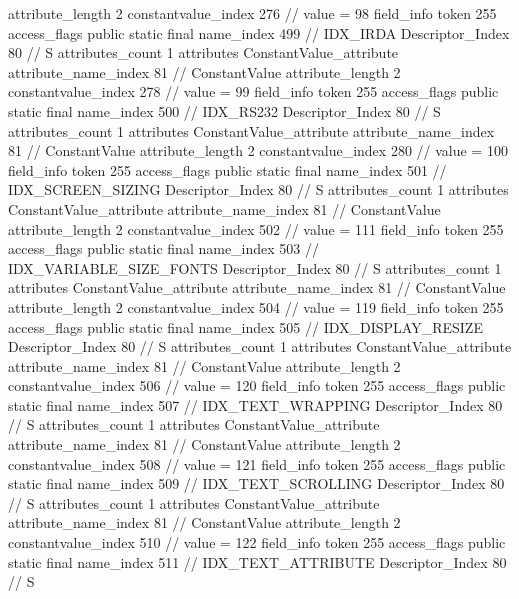 {{{{{{{					attribute_length	2
					constantvalue_index	276		// value = 98
				}
				}
			}
			field_info {
				token	255
				access_flags	public static final
				name_index	499		// IDX_IRDA
				Descriptor_Index	80		// S
				attributes_count	1
				attributes {
				ConstantValue_attribute {
					attribute_name_index	81		// ConstantValue
					attribute_length	2
					constantvalue_index	278		// value = 99
				}
				}
			}
			field_info {
				token	255
				access_flags	public static final
				name_index	500		// IDX_RS232
				Descriptor_Index	80		// S
				attributes_count	1
				attributes {
				ConstantValue_attribute {
					attribute_name_index	81		// ConstantValue
					attribute_length	2
					constantvalue_index	280		// value = 100
				}
				}
			}
			field_info {
				token	255
				access_flags	public static final
				name_index	501		// IDX_SCREEN_SIZING
				Descriptor_Index	80		// S
				attributes_count	1
				attributes {
				ConstantValue_attribute {
					attribute_name_index	81		// ConstantValue
					attribute_length	2
					constantvalue_index	502		// value = 111
				}
				}
			}
			field_info {
				token	255
				access_flags	public static final
				name_index	503		// IDX_VARIABLE_SIZE_FONTS
				Descriptor_Index	80		// S
				attributes_count	1
				attributes {
				ConstantValue_attribute {
					attribute_name_index	81		// ConstantValue
					attribute_length	2
					constantvalue_index	504		// value = 119
				}
				}
			}
			field_info {
				token	255
				access_flags	public static final
				name_index	505		// IDX_DISPLAY_RESIZE
				Descriptor_Index	80		// S
				attributes_count	1
				attributes {
				ConstantValue_attribute {
					attribute_name_index	81		// ConstantValue
					attribute_length	2
					constantvalue_index	506		// value = 120
				}
				}
			}
			field_info {
				token	255
				access_flags	public static final
				name_index	507		// IDX_TEXT_WRAPPING
				Descriptor_Index	80		// S
				attributes_count	1
				attributes {
				ConstantValue_attribute {
					attribute_name_index	81		// ConstantValue
					attribute_length	2
					constantvalue_index	508		// value = 121
				}
				}
			}
			field_info {
				token	255
				access_flags	public static final
				name_index	509		// IDX_TEXT_SCROLLING
				Descriptor_Index	80		// S
				attributes_count	1
				attributes {
				ConstantValue_attribute {
					attribute_name_index	81		// ConstantValue
					attribute_length	2
					constantvalue_index	510		// value = 122
				}
				}
			}
			field_info {
				token	255
				access_flags	public static final
				name_index	511		// IDX_TEXT_ATTRIBUTE
				Descriptor_Index	80		// S
}}}}}

